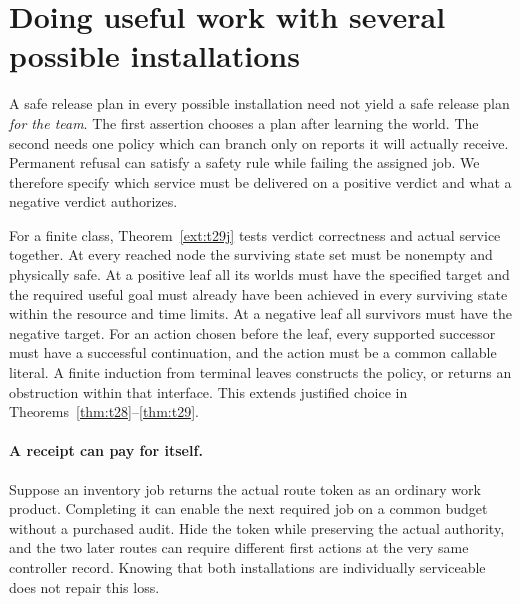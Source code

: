 \section{Doing useful work with several possible installations}\label{sec:work}
A safe release plan in every possible installation need not yield a safe release plan \emph{for the team}. The first assertion chooses a plan after learning the world. The second needs one policy which can branch only on reports it will actually receive. Permanent refusal can satisfy a safety rule while failing the assigned job. We therefore specify which service must be delivered on a positive verdict and what a negative verdict authorizes.

For a finite class, Theorem~\ref{ext:t29j} tests verdict correctness and actual service together. At every reached node the surviving state set must be nonempty and physically safe. At a positive leaf all its worlds must have the specified target and the required useful goal must already have been achieved in every surviving state within the resource and time limits. At a negative leaf all survivors must have the negative target. For an action chosen before the leaf, every supported successor must have a successful continuation, and the action must be a common callable literal. A finite induction from terminal leaves constructs the policy, or returns an obstruction within that interface. This extends justified choice in Theorems~\ref{thm:t28}--\ref{thm:t29}.

\paragraph{A receipt can pay for itself.}
Suppose an inventory job returns the actual route token as an ordinary work product. Completing it can enable the next required job on a common budget without a purchased audit. Hide the token while preserving the actual authority, and the two later routes can require different first actions at the very same controller record. Knowing that both installations are individually serviceable does not repair this loss.

